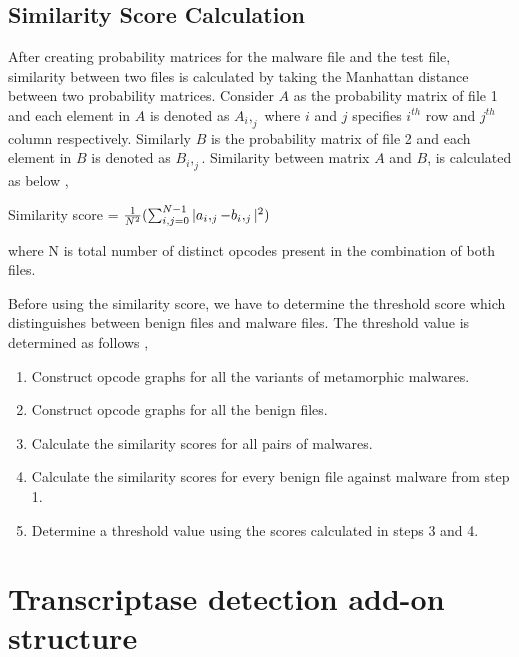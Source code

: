 \subsection{Similarity Score Calculation}  \label{opcodescorecalculation}
After creating probability matrices for the malware file and the test file, similarity between two files is calculated by taking the Manhattan distance between two probability matrices. Consider $A$ as the probability matrix of file 1 and each element in $A$ is denoted as $A_i,_j$ where $i$ and $j$ specifies $i^{th}$ row and $j^{th}$ column respectively. Similarly $B$ is the probability matrix of file 2 and each element in $B$ is denoted as $B_i,_j$. Similarity between matrix $A$ and $B$, is calculated as below \cite{bib8},

Similarity score = ${1 \over N^2}(\sum_{i,j=0}^{N-1}|a_i,_j-b_i,_j|^2)$ 

where N is total number of distinct opcodes present in the combination of both files.

Before using the similarity score, we have to determine the threshold score which distinguishes between benign files and malware files. The threshold value is determined as follows \cite{bib8},
\begin{enumerate}
\item Construct opcode graphs for all the variants of metamorphic malwares.
\item Construct opcode graphs for all the benign files.
\item Calculate the similarity scores for all pairs of malwares.
\item Calculate the similarity scores for every benign file against malware from step 1.
\item Determine a threshold value using the scores calculated in steps 3 and 4.
\end{enumerate}

\section{Transcriptase detection add-on structure}

